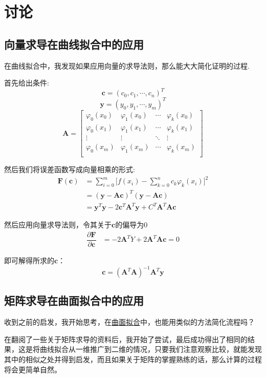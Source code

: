 \chapter{讨论}
\label{sec:discuss}
\section{向量求导在曲线拟合中的应用}
在曲线拟合中，我发现如果应用向量的求导法则，那么能大大简化证明的过程.

首先给出条件:
\[\bm{c}=(c_0,c_1,\cdots,c_n)^T\]
\[\bm{y}=(y_0,y_1,\cdots,y_m)^T\]
\[\bm{A} =
\begin{bmatrix}
{\varphi_{0}(x_0)}&{\varphi_{1}(x_0)}& \cdots &{\varphi_{k}(x_0)}\\
{\varphi_{0}(x_1)}&{\varphi_{1}(x_1)}& \cdots &{\varphi_{k}(x_1)}\\
 \vdots & \vdots & \ddots & \vdots \\
{\varphi_{0}(x_m)}&{\varphi_{1}(x_m)}& \cdots &{\varphi_{k}(x_m)}\\
\end{bmatrix}\]


然后我们将误差函数写成向量相乘的形式:
\begin{align}
\label{511}
\bm{F}(\bm{c})&=\sum_{i=0}^m\big[f(x_i)-
\sum_{k=0}^nc_k\varphi_{k}(x_i)\big]^2\\
&=
(\bm{y}-\bm{A}\bm{c})^T(\bm{y}-\bm{A}\bm{c})\\
&=
\bm{y}^T\bm{y}-2\bm{c}^T\bm{A}^T\bm{y}+C^T\bm{A}^T\bm{A}\bm{c}
\end{align}

然后应用向量求导法则，令其关于$\bm{c}$的偏导为0
\begin{align}
\dfrac{\partial \bm{F}}{\partial \bm{c}}&=
-2\bm{A}^TY+2\bm{A}^T\bm{A}\bm{c}=0
\end{align}

即可解得所求的$\bm{c}$：
\begin{equation}
\label{ccc}
\boxed{
\bm{c}=(\bm{A}^T\bm{A})^{-1}\bm{A}^T\bm{y}
}
\end{equation}

\newpage
\section{矩阵求导在曲面拟合中的应用}
收到之前的启发，我开始思考，在\hyperref[sec:qmnh]{曲面拟合}中，也能用类似的方法简化流程吗？

在翻阅了一些关于矩阵求导的资料后，我开始了尝试，最后成功得出了相同的结果，这是将曲线拟合从一维推广到二维的情况，只要我们注意观察比较，就能发现其中的相似之处并得到启发，而且如果关于矩阵的掌握熟练的话，那么计算的过程将会更简单自然。

